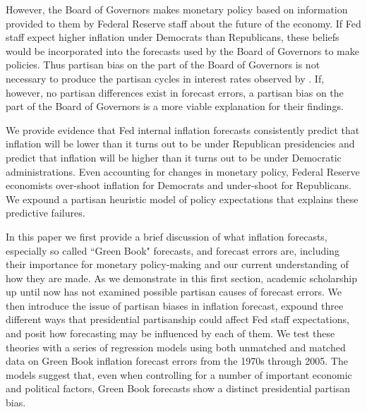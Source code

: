 \documentclass[a4paper]{article}\usepackage{graphicx, color}
\begin{document}


However, the Board of Governors makes monetary policy based on information provided to them by Federal Reserve staff about the future of the economy. If Fed staff expect higher inflation under Democrats than Republicans, these beliefs would be incorporated into the forecasts used by the Board of Governors to make policies. Thus partisan bias on the part of the Board of Governors is not necessary to produce the partisan cycles in interest rates observed by \cite{Clark2011}. If, however, no partisan differences exist in forecast errors, a partisan bias on the part of the Board of Governors is a more viable explanation for their findings.

We provide evidence that Fed internal inflation forecasts consistently predict that inflation will be lower than it turns out to be under Republican presidencies and predict that inflation will be higher than it turns out to be under Democratic administrations. Even accounting for changes in monetary policy, Federal Reserve economists over-shoot inflation for Democrats and under-shoot for Republicans. We expound a partisan heuristic model of policy expectations that explains these predictive failures.

In this paper we first provide a brief discussion of what inflation forecasts, especially so called ``Green Book" forecasts, and forecast errors are, including their importance for monetary policy-making and our current understanding of how they are made. As we demonstrate in this first section, academic scholarship up until now has not examined possible partisan causes of forecast errors. We then introduce the issue of partisan biases in inflation forecast, expound three different ways that presidential partisanship could affect Fed staff expectations, and posit how forecasting may be influenced by each of them. We test these theories with a series of regression models using both unmatched and matched data on Green Book inflation forecast errors from the 1970s through 2005. The models suggest that, even when controlling for a number of important economic and political factors, Green Book forecasts show a distinct presidential partisan bias. 
\end{document}
